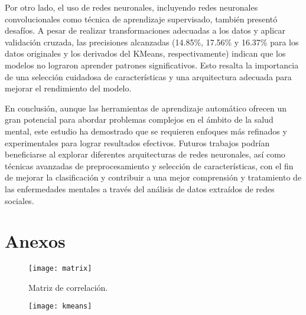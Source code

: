 \documentclass[
10pt, %
a4paper, %
oneside, %
headinclude,footinclude, %
BCOR5mm, %
]{scrartcl}
\begin{document}
Por otro lado, el uso de redes neuronales, incluyendo redes neuronales convolucionales como técnica de aprendizaje supervisado, también presentó desafíos. 
A pesar de realizar transformaciones adecuadas a los datos y aplicar validación cruzada, las precisiones alcanzadas (14.85\%, 17.56\% y 16.37\% para los datos originales y 
los derivados del KMeans, respectivamente) indican que los modelos no lograron aprender patrones significativos. Esto resalta la importancia de una selección cuidadosa de características y una 
arquitectura adecuada para mejorar el rendimiento del modelo.

En conclusión, aunque las herramientas de aprendizaje automático ofrecen un gran potencial para abordar problemas complejos en el ámbito de la salud mental, este estudio ha demostrado que se requieren enfoques más refinados 
y experimentales para lograr resultados efectivos. Futuros trabajos podrían beneficiarse al explorar diferentes arquitecturas de redes neuronales, así como técnicas avanzadas de preprocesamiento y selección de características, 
con el fin de mejorar la clasificación y contribuir a una mejor comprensión y tratamiento de las enfermedades mentales a través del análisis de datos extraídos de redes sociales.

\section{Anexos}


\begin{figure}[tb]
\centering 
\texttt{[image: matrix]} 
\caption[]{Matriz de correlación.} %
\label{fig:gallery} 
\end{figure}

\begin{figure}[tb]
\centering 
\texttt{[image: kmeans]} 
\caption[]{} %
\label{fig:gallery} 
\end{figure}





\renewcommand{\refname}{\spacedlowsmallcaps{References}} %




\end{document}
